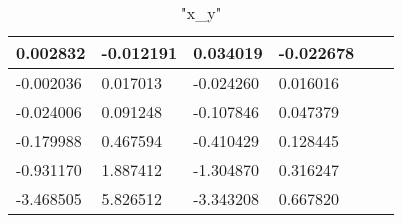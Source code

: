 \documentclass[12pt]{article}
\begin{document}
\begin{table}[h]
\caption { "x_y" }
\center
\begin{tabular} {|l|l|l|l|l|l|}
 \hline
0.002832 & -0.012191 & 0.034019 & -0.022678\\ \hline 
-0.002036 & 0.017013 & -0.024260 & 0.016016\\ \hline 
-0.024006 & 0.091248 & -0.107846 & 0.047379\\ \hline 
-0.179988 & 0.467594 & -0.410429 & 0.128445\\ \hline 
-0.931170 & 1.887412 & -1.304870 & 0.316247\\ \hline 
-3.468505 & 5.826512 & -3.343208 & 0.667820\\ \hline 

\end{tabular}
\end{table} 
\end{document}

